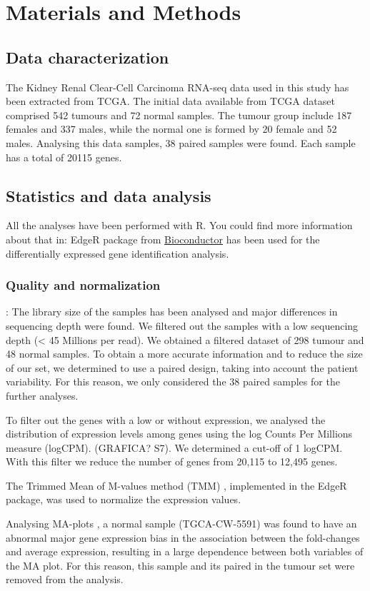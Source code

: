 \documentclass[9pt,twocolumn,twoside]{gsajnl}
\begin{document}
\section*{Materials and Methods}
\subsection*{Data characterization}
The Kidney Renal Clear-Cell Carcinoma RNA-seq data used in this study has been extracted from TCGA. The initial data available from TCGA dataset comprised 542 tumours and 72 normal samples. The tumour group include 187 females and 337 males, while the normal one is formed by 20 female and 52 males. Analysing this data samples, 38 paired samples were found. Each sample has a total of 20115 genes. 

\subsection*{Statistics and data analysis}
All the analyses have been performed with R. You could find more information about that in: EdgeR package from \href{https://bioconductor.org}{Bioconductor} \citep{Gentleman2004} has been used for the differentially expressed gene identification analysis.


\subsubsection*{Quality and normalization }
: The library size of the samples has been analysed and major differences in sequencing depth were found. We filtered out the samples with a low sequencing depth (< 45 Millions per read). We obtained a filtered dataset of 298 tumour and 48 normal samples. To obtain a more accurate information and to reduce the size of our set, we determined to use a paired design, taking into account the patient variability. For this reason, we only considered the 38 paired samples for the further analyses.

To filter out the genes with a low or without expression, we analysed the distribution of expression levels among genes using the log Counts Per Millions measure (logCPM). (GRAFICA? S7). We determined a cut-off of 1 logCPM. With this filter we reduce the number of genes from 20,115 to 12,495 genes.

The Trimmed Mean of M-values method (TMM) \citep{Robinson2010}, implemented in the EdgeR package, was used to normalize the expression values.

Analysing MA-plots \citep{Dudoit2002}, a normal sample (TGCA-CW-5591) was found to have an abnormal major gene expression bias in the association between the fold-changes and average expression, resulting in a large dependence between both variables of the MA plot. For this reason, this sample and its paired in the tumour set were removed from the analysis.
\end{document}
